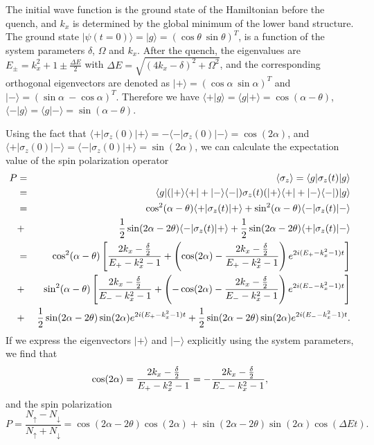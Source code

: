 \documentclass[prl,aps,twocolumn,showpacs,floatfix]{revtex4-1}
\begin{document}
\begin{appendix}
\begin{widetext}
The initial wave function is the ground state of the Hamiltonian before the
quench, and $k_{x} $ is determined by the global minimum of the lower band
structure. The ground state $|\psi (t=0)\rangle =|g\rangle =(\cos {\theta }%
~\sin {\theta })^{T}$, is a function of the system parameters $\delta $, $%
\Omega $ and $k_{x}$. After the quench, the eigenvalues are $E_{\pm
}=k_{x}^{2}+1\pm \frac{\Delta E}{2}$ with $\Delta
E=\sqrt{(4k_{x}-\delta )^{2}+\Omega ^{2}}$, and the corresponding
orthogonal eigenvectors are denoted as $|+\rangle =(\cos {\alpha
}~\sin {\alpha })^{T}$ and $|-\rangle =(\sin {\alpha }~-\cos {\alpha
})^{T}$. Therefore we have $\langle +|g\rangle =\langle g|+\rangle
=\cos (\alpha -\theta )$, $\langle -|g\rangle =\langle g|-\rangle
=\sin (\alpha -\theta )$.

Using the fact that $\langle +|\sigma _{z}(0)|+\rangle =-\langle -|\sigma
_{z}(0)|-\rangle =\cos (2\alpha )$, and $\langle +|\sigma _{z}(0)|-\rangle
=\langle -|\sigma _{z}(0)|+\rangle =\sin (2\alpha )$, we can calculate the
expectation value of the spin polarization operator
\begin{eqnarray}
P &=&\langle \sigma _{z}\rangle =\langle g|\sigma _{z}(t)|g\rangle \\
&=&\langle g|(|+\rangle \langle +|+|-\rangle \langle -|)\sigma
_{z}(t)(|+\rangle \langle +|+|-\rangle \langle -|)|g\rangle \\
&=&\cos ^{2}(\alpha -\theta )\langle +|\sigma _{z}(t)|+\rangle +\sin
^{2}(\alpha -\theta )\langle -|\sigma _{z}(t)|-\rangle \\
&+&\frac{1}{2}\sin (2\alpha -2\theta )\langle -|\sigma _{z}(t)|+\rangle +%
\frac{1}{2}\sin (2\alpha -2\theta )\langle +|\sigma _{z}(t)|-\rangle \\
&=&\cos ^{2}(\alpha -\theta )\left[ \frac{2k_{x}-\frac{\delta }{2}}{%
E_{+}-k_{x}^{2}-1}+\left( \cos (2\alpha )-\frac{2k_{x}-\frac{\delta }{2}}{%
E_{+}-k_{x}^{2}-1}\right) e^{2i(E_{+}-k_{x}^{2}-1)t}\right] \\
&+&\sin ^{2}(\alpha -\theta )\left[ \frac{2k_{x}-\frac{\delta }{2}}{%
E_{-}-k_{x}^{2}-1}+\left( -\cos (2\alpha )-\frac{2k_{x}-\frac{\delta }{2}}{%
E_{-}-k_{x}^{2}-1}\right) e^{2i(E_{-}-k_{x}^{2}-1)t}\right] \\
&+&\frac{1}{2}\sin (2\alpha -2\theta )\sin (2\alpha
)e^{2i(E_{+}-k_{x}^{2}-1)t}+\frac{1}{2}\sin (2\alpha -2\theta )\sin (2\alpha
)e^{2i(E_{-}-k_{x}^{2}-1)t}.
\end{eqnarray}%
If we express the eigenvectors $|+\rangle $ and $|-\rangle $ explicitly
using the system parameters, we find that
\begin{equation}
\cos (2\alpha )=\frac{2k_{x}-\frac{\delta }{2}}{E_{+}-k_{x}^{2}-1}=-\frac{%
2k_{x}-\frac{\delta }{2}}{E_{-}-k_{x}^{2}-1},
\end{equation}%
and the spin polarization
\begin{equation}
P=\frac{N_{\uparrow }-N_{\downarrow }}{N_{\uparrow }+N_{\downarrow
}}=\cos (2\alpha -2\theta )\cos (2\alpha )+\sin (2\alpha -2\theta
)\sin (2\alpha )\cos (\Delta Et).
\end{equation}%
%
%


\end{widetext}
\end{appendix}
\end{document}
